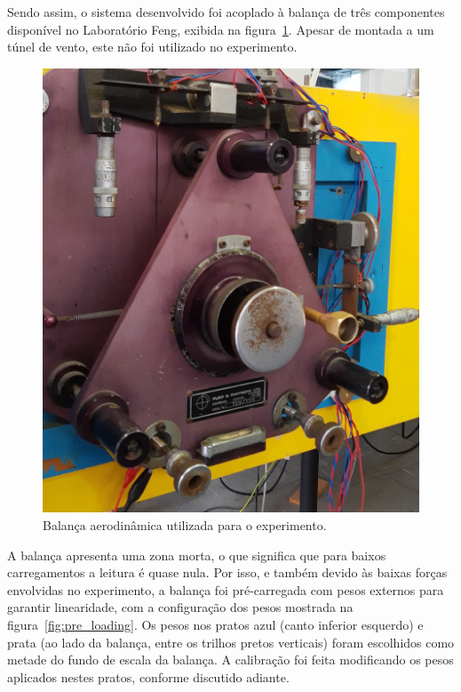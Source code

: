 Sendo assim, o sistema desenvolvido foi acoplado à balança de três componentes disponível no Laboratório Feng, exibida na figura~\ref{fig:3axis_scale}. Apesar de montada a um túnel de vento, este não foi utilizado no experimento.

\begin{figure}[htbp]
    \centering
    \includegraphics[width=\textwidth]{img/eixocropped.jpg}
    \caption{Balança aerodinâmica utilizada para o experimento.}\label{fig:3axis_scale}
\end{figure}

A balança apresenta uma zona morta, o que significa que para baixos carregamentos a leitura é quase nula. Por isso, e também devido às baixas forças envolvidas no experimento, a balança foi pré-carregada com pesos externos para garantir linearidade, com a configuração dos pesos mostrada na figura~\ref{fig:pre_loading}. Os pesos nos pratos azul (canto inferior esquerdo) e prata (ao lado da balança, entre os trilhos pretos verticais) foram escolhidos como metade do fundo de escala da balança. A calibração foi feita modificando os pesos aplicados nestes pratos, conforme discutido adiante.

